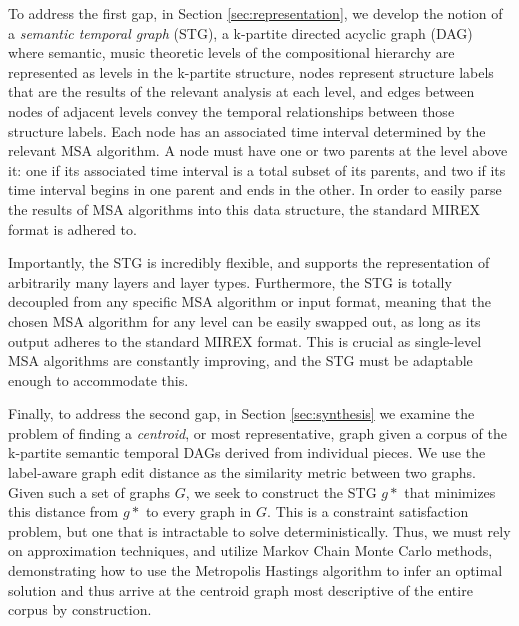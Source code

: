 \documentclass{article}
\begin{document}
To address the first gap, in Section \ref{sec:representation}, we develop the notion of a \textit{semantic temporal graph} (STG), a k-partite directed acyclic graph (DAG) where semantic, music theoretic levels of the compositional hierarchy are represented as levels in the k-partite structure, nodes represent structure labels that are the results of the relevant analysis at each level, and edges between nodes of adjacent levels convey the temporal relationships between those structure labels. Each node has an associated time interval determined by the relevant MSA algorithm. A node must have one or two parents at the level above it: one if its associated time interval is a total subset of its parents, and two if its time interval begins in one parent and ends in the other. In order to easily parse the results of MSA algorithms into this data structure, the standard MIREX format is adhered to. 

Importantly, the STG is incredibly flexible, and supports the representation of arbitrarily many layers and layer types. Furthermore, the STG is totally decoupled from any specific MSA algorithm or input format, meaning that the chosen MSA algorithm for any level can be easily swapped out, as long as its output adheres to the standard MIREX format. This is crucial as single-level MSA algorithms are constantly improving, and the STG must be adaptable enough to accommodate this.

Finally, to address the second gap, in Section \ref{sec:synthesis} we examine the problem of finding a \textit{centroid}, or most representative, graph given a corpus of the k-partite semantic temporal DAGs derived from individual pieces. We use the label-aware graph edit distance as the similarity metric between two graphs. Given such a set of graphs $G$, we seek to construct the STG $g*$ that minimizes this distance from $g*$ to every graph in $G$. This is a constraint satisfaction problem, but one that is intractable to solve deterministically. Thus, we must rely on approximation techniques, and utilize Markov Chain Monte Carlo methods, demonstrating how to use the Metropolis Hastings algorithm to infer an optimal solution and thus arrive at the centroid graph most descriptive of the entire corpus by construction. 
\end{document}

